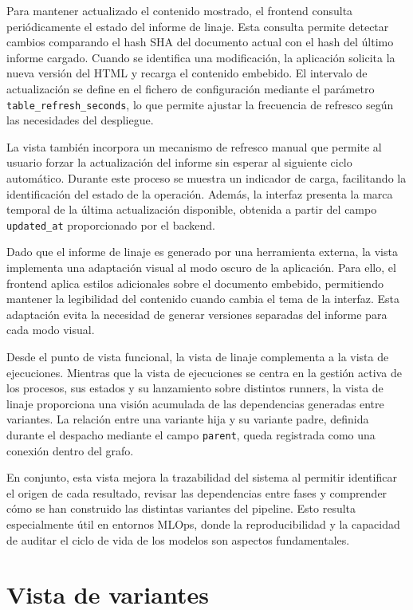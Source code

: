 Para mantener actualizado el contenido mostrado, el frontend consulta periódicamente el estado del informe de linaje. Esta consulta permite detectar cambios comparando el hash SHA del documento actual con el hash del último informe cargado. Cuando se identifica una modificación, la aplicación solicita la nueva versión del HTML y recarga el contenido embebido. El intervalo de actualización se define en el fichero de configuración mediante el parámetro \texttt{table\_refresh\_seconds}, lo que permite ajustar la frecuencia de refresco según las necesidades del despliegue.

La vista también incorpora un mecanismo de refresco manual que permite al usuario forzar la actualización del informe sin esperar al siguiente ciclo automático. Durante este proceso se muestra un indicador de carga, facilitando la identificación del estado de la operación. Además, la interfaz presenta la marca temporal de la última actualización disponible, obtenida a partir del campo \texttt{updated\_at} proporcionado por el backend.

Dado que el informe de linaje es generado por una herramienta externa, la vista implementa una adaptación visual al modo oscuro de la aplicación. Para ello, el frontend aplica estilos adicionales sobre el documento embebido, permitiendo mantener la legibilidad del contenido cuando cambia el tema de la interfaz. Esta adaptación evita la necesidad de generar versiones separadas del informe para cada modo visual.

Desde el punto de vista funcional, la vista de linaje complementa a la vista de ejecuciones. Mientras que la vista de ejecuciones se centra en la gestión activa de los procesos, sus estados y su lanzamiento sobre distintos runners, la vista de linaje proporciona una visión acumulada de las dependencias generadas entre variantes. La relación entre una variante hija y su variante padre, definida durante el despacho mediante el campo \texttt{parent}, queda registrada como una conexión dentro del grafo.

En conjunto, esta vista mejora la trazabilidad del sistema al permitir identificar el origen de cada resultado, revisar las dependencias entre fases y comprender cómo se han construido las distintas variantes del pipeline. Esto resulta especialmente útil en entornos MLOps, donde la reproducibilidad y la capacidad de auditar el ciclo de vida de los modelos son aspectos fundamentales.


\section{Vista de variantes}

